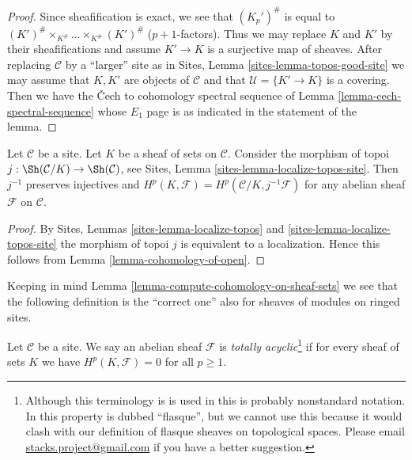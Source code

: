 \begin{proof}
Since sheafification is exact, we see that
$(K_p')^\#$ is equal to
$(K')^\# \times_{K^\#} \ldots \times_{K^\#} (K')^\#$
($p + 1$-factors). Thus we may replace $K$ and $K'$ by
their sheafifications and assume $K' \to K$ is a surjective
map of sheaves. After replacing $\mathcal{C}$ by a ``larger'' site as in
Sites, Lemma \ref{sites-lemma-topos-good-site} 
we may assume that $K, K'$ are objects of $\mathcal{C}$ and that
$\mathcal{U} = \{K' \to K\}$ is a covering. Then we have the {\v C}ech
to cohomology spectral sequence of Lemma \ref{lemma-cech-spectral-sequence}
whose $E_1$ page is as indicated in the statement of the lemma.
\end{proof}

\begin{lemma}
\label{lemma-cohomology-on-sheaf-sets}
Let $\mathcal{C}$ be a site. Let $K$ be a sheaf of sets on $\mathcal{C}$.
Consider the morphism of topoi
$j : \Sh(\mathcal{C}/K) \to \Sh(\mathcal{C})$, see
Sites, Lemma \ref{sites-lemma-localize-topos-site}.
Then $j^{-1}$ preserves injectives and
$H^p(K, \mathcal{F}) = H^p(\mathcal{C}/K, j^{-1}\mathcal{F})$
for any abelian sheaf $\mathcal{F}$ on $\mathcal{C}$.
\end{lemma}

\begin{proof}
By
Sites, Lemmas \ref{sites-lemma-localize-topos} and
\ref{sites-lemma-localize-topos-site}
the morphism of topoi $j$ is
equivalent to a localization. Hence this follows from
Lemma \ref{lemma-cohomology-of-open}.
\end{proof}

\noindent
Keeping in mind Lemma \ref{lemma-compute-cohomology-on-sheaf-sets}
we see that the following definition is the ``correct one'' also
for sheaves of modules on ringed sites.

\begin{definition}
\label{definition-limp}
Let $\mathcal{C}$ be a site.
We say an abelian sheaf $\mathcal{F}$ is
{\it totally acyclic}\footnote{Although this terminology is is used in
\cite[Vbis, Proposition 1.3.10]{SGA4} this is probably nonstandard notation.
In \cite[V, Definition 4.1]{SGA4} this property is dubbed ``flasque'', but
we cannot use this because it would clash with our definition
of flasque sheaves on topological spaces. Please email
\href{mailto:stacks.project@gmail.com}{stacks.project@gmail.com}
if you have a better suggestion.}
if for every sheaf of sets $K$ we have $H^p(K, \mathcal{F}) = 0$
for all $p \geq 1$.
\end{definition}

